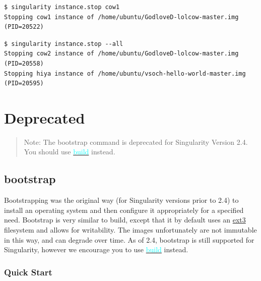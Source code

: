 \documentclass[a4paper]{article}
\newcounter{subsubsubsection}[subsubsection]
\begin{document}
\begin{lstlisting}[frame=single]
$ singularity instance.stop cow1
Stopping cow1 instance of /home/ubuntu/GodloveD-lolcow-master.img (PID=20522)
\end{lstlisting}

\begin{lstlisting}[frame=single]
$ singularity instance.stop --all
Stopping cow2 instance of /home/ubuntu/GodloveD-lolcow-master.img (PID=20558)
Stopping hiya instance of /home/ubuntu/vsoch-hello-world-master.img (PID=20595)
\end{lstlisting}		
		
\noindent
{}

\section{Deprecated}

\begin{quote}
Note: The bootstrap command is deprecated for Singularity Version 2.4. You should use \hyperref[sec:buildcontainer]{{\textcolor{cyan}{build}}} instead.
\end{quote}

\subsection{bootstrap}
\label{sec:bootstrap}

Bootstrapping was the original way (for Singularity versions prior to 2.4) to install an operating system and then configure it appropriately for a specified need. Bootstrap is very similar to build, except that it by default uses an \href{https://en.wikipedia.org/wiki/Ext3}{ext3} filesystem and allows for writability. The images unfortunately are not immutable in this way, and can degrade over time. As of 2.4, bootstrap is still supported for Singularity, however we encourage you to use \hyperref[sec:buildcontainer]{{\textcolor{cyan}{build}}} instead.

	\subsubsection{Quick Start}
	
\end{document}
